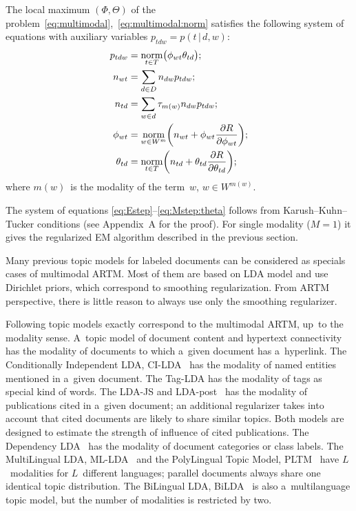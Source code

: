 \documentclass{sig-alternate}
\newcommand{\norm}{\mathop{\rm norm}\limits}
\newcommand{\cond}{\mspace{3mu}{|}\mspace{3mu}}
\begin{document}
The local maximum $(\Phi,\Theta)$
of the problem~\eqref{eq:multimodal},~\eqref{eq:multimodal:norm}
satisfies the following system of equations
with auxiliary variables $p_{tdw} = p(t\cond d,w)$:
\begin{align}
    \label{eq:Estep}
    p_{tdw} &= \norm_{t\in T} \bigl(\phi_{wt}\theta_{td}\bigr);
\\\notag
    n_{wt} &= \sum_{d\in D} n_{dw} p_{tdw};
\\\notag
    n_{td} &= \sum_{w\in d} \tau_{m(w)} n_{dw} p_{tdw};
\\
    \label{eq:Mstep:phi}
    \phi_{wt} &= \norm_{w\in W^m}
        \biggl(
            n_{wt} + \phi_{wt} \frac{\partial R}{\partial \phi_{wt}}
        \biggr);
\\
    \label{eq:Mstep:theta}
    \theta_{td} &= \norm_{t\in T}
        \biggl(
            n_{td} + \theta_{td} \frac{\partial R}{\partial \theta_{td}}
        \biggr);
\end{align}
where $m(w)$~is the modality of the term~$w$,\; $w\in W^{m(w)}$.

The system of equations \eqref{eq:Estep}--\eqref{eq:Mstep:theta}
follows from Karush--Kuhn--Tucker conditions (see Appendix~A for the proof).
For single modality (${M=1}$) it gives the regularized EM algorithm
described in the previous section.

Many previous topic models for labeled documents
can be considered as specials cases of multimodal ARTM.
Most of them are based on LDA model and use Dirichlet priors,
which correspond to smoothing regularization.
From ARTM perspective,
there is little reason to always use only the smoothing regularizer.

Following topic models exactly correspond to the multimodal ARTM,
up~to the modality sense.
A~topic model of document content and hypertext connectivity~\cite{cohn00missing}
has the modality of documents to which a~given document has a~hyperlink.
The Conditionally Independent LDA, CI-LDA~\cite{newman06entity}
has the modality of named entities mentioned in a~given document.
The Tag-LDA \cite{si09taglda}
has the modality of tags as special kind of words.
The LDA-JS and LDA-post~\cite{dietz07unsupervised}
has the modality of publications cited in a~given document;
an additional regularizer takes into account that cited documents are likely to share similar topics.
Both models are designed to estimate the strength of influence of cited publications.
The Dependency LDA~\cite{rubin12statistical}
has the modality of document categories or class labels.
The MultiLingual LDA, ML-LDA~\cite{ni09mining} and
the PolyLingual Topic Model, PLTM~\cite{mimno09polylingual}
have $L$~modalities for $L$~different languages;
parallel documents always share one identical topic distribution.
The BiLingual LDA, BiLDA~\cite{smet09weblinking}
is also a~multilanguage topic model, but the number of modalities is restricted by two.
\end{document}
